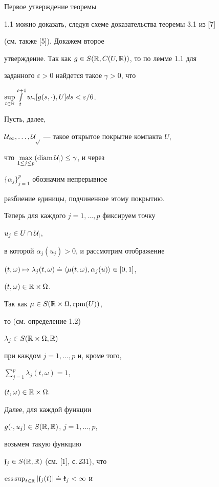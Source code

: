 \begin{pf}


Первое утверждение теоремы


1.1 можно доказать, следуя схеме доказательства теоремы 3.1 из [7]


(см. также [5]). Докажем второе


утверждение. Так как $g\in S(\Bbb R,C(U,\Bbb R))$, то по лемме 1.1 для


заданного $\varepsilon{>}0$ найдется такое $\gamma{>}0$, что


$\sup\limits_{t\in\Bbb R}\int\limits_{t}^{t+1}


w_{\gamma}[g(s,\cdot),U]ds<\varepsilon/6$.


Пусть, далее,


$\cal U_1,\dotsc,\cal U_{p}$ --- такое открытое покрытие компакта $U$,


что $\max\limits_{1\le j\le p} (\operatorname{diam} \cal U_{j})\le\gamma$, и через


$\{\alpha_{j}\}_{j=1}^{p}$ обозначим непрерывное


разбиение единицы, подчиненное этому покрытию.


Теперь для каждого $j=1,\dotsc,p$ фиксируем точку


$u_{j}\in U\cap\cal U_{j}$,


в которой $\alpha_{j}(u_{j})>0$, и рассмотрим отображение


$(t,\omega)\mapsto\lambda_{j}(t,\omega)\doteq


\la\mu(t,\omega),\alpha_{j}(u)\ra \in [0,1]$,


$(t,\omega)\in\Bbb R\times\Omega$.


Так как $\mu\in S(\Bbb R\times\Omega,\operatorname{rpm}(U))$,


то (см. определение 1.2) 


$\lambda_{j}\in S(\Bbb R\times\Omega,\Bbb R)$


при каждом $j=1,\dotsc,p$ и, кроме того,


$\sum\limits_{j=1}^{p}\lambda_{j}(t,\omega)=1$,


$(t,\omega)\in\Bbb R\times\Omega.$


Далее, для каждой функции


$g(\cdot,u_{j})\in S(\Bbb R,\Bbb R)$, $j=1,\dotsc,p$,


возьмем такую функцию


$\frak f_{j}\in S(\Bbb R,\Bbb R)$ (см. [1], с.\,231), что


$\operatorname{ess\,sup}\limits_{t\in \Bbb R}|\frak f_{j}(t)|\doteq\frak k_{j}<\infty$ и



\end{pf}
